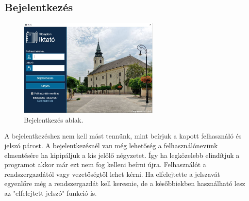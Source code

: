 \documentclass[
]{thesis-ekf}
\theoremstyle{definition}
\theoremstyle{remark}
\begin{document}
\subsection{Bejelentkezés}
\begin{figure}[!ht]
	\centering
	\includegraphics[width=7cm]{dokukepek/clogin}
	\caption{Bejelentkezés ablak.}
	\label{fig:clogin2}
\end{figure}
A bejelentkezéshez nem kell mást tennünk, mint beírjuk a kapott felhasználó és jelszó párost. A bejelentkezésnél van még lehetőség a felhasználónevünk elmentésére ha kipipáljuk a kis jelölő négyzetet. Így ha legközelebb elindítjuk a programot akkor már ezt nem fog kelleni beírni újra. Felhasználót a rendszergazdától vagy vezetőségtől lehet kérni. Ha elfelejtette a jelszavát egyenlőre még a rendszergazdát kell keresnie, de a későbbiekben használható lesz az "elfelejtett jelszó" funkció is.
\end{document}
